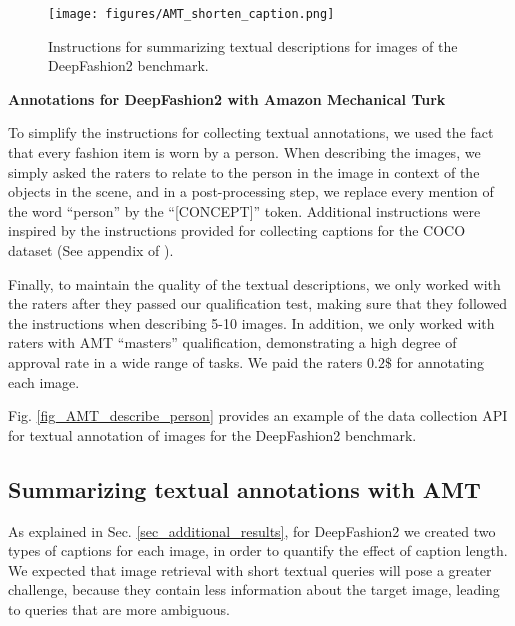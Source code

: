 \documentclass[runningheads]{llncs}
\newcommand{\secref}[1]{Sec. \ref{#1}}
\newcommand{\figref}[1]{Fig. \ref{#1}}
\newcommand{\concept}{[CONCEPT]}
\begin{document}
\begin{figure}[htbp]
    \centering
    \texttt{[image: figures/AMT\_shorten\_caption.png]} \hspace{-10pt}
    \vspace{-10pt}
    \caption{
Instructions for summarizing textual descriptions for images of the DeepFashion2 benchmark.
}
    \label{fig_AMT_shorten_caption}
    \vspace{-5pt}
\end{figure}

\vspace{5pt}\noindent\textbf{Annotations for DeepFashion2 with Amazon Mechanical Turk}

To simplify the instructions for collecting textual annotations, we used the fact that every fashion item is worn by a person.
When describing the images, we simply asked the raters to relate to the person in the image in context of the objects in the scene, and in a post-processing step, we replace every mention of the word ``person'' by the ``\concept{}'' token. Additional instructions were inspired by the instructions provided for collecting captions for the COCO dataset (See appendix of \cite{lin2014microsoft}).

Finally, to maintain the quality of the textual descriptions, we only worked with the raters after they passed our qualification test, making sure that they followed the instructions when describing 5-10 images. In addition, we only worked with raters with AMT ``masters'' qualification, demonstrating a high degree of approval rate in a wide range of tasks. We paid the raters $0.2\$$ for annotating each image.

\figref{fig_AMT_describe_person} provides an example of the data collection API for textual annotation of images for the DeepFashion2 benchmark.

\subsection{Summarizing textual annotations with AMT}
\label{sec_short_vs_detailed_AMT}

As explained in \secref{sec_additional_results}, for DeepFashion2 we created two types of captions for each image, in order to quantify the effect of caption length. We expected that image retrieval with short textual queries will pose a greater challenge, because they contain less information about the target image, leading to queries that are more ambiguous.
\end{document}
